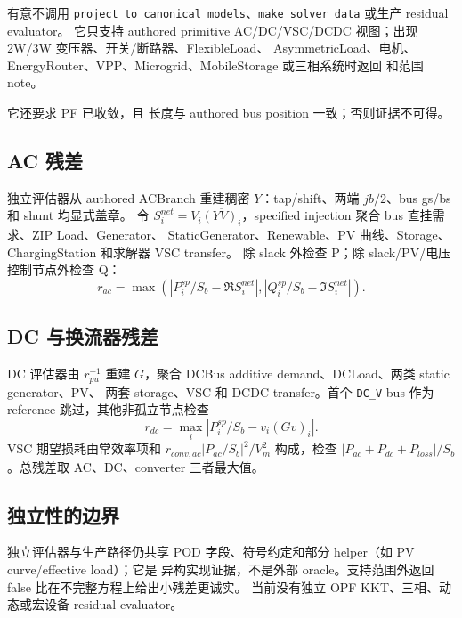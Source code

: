 有意不调用 \texttt{project\_to\_canonical\_models}、\texttt{make\_solver\_data} 或生产 residual evaluator。
它只支持 authored primitive AC/DC/VSC/DCDC 视图；出现 2W/3W 变压器、开关/断路器、FlexibleLoad、
AsymmetricLoad、电机、EnergyRouter、VPP、Microgrid、MobileStorage 或三相系统时返回
 和范围 note。

它还要求 PF 已收敛，且  长度与 authored bus position 一致；否则证据不可得。

\subsection{AC 残差}

独立评估器从 authored ACBranch 重建稠密 $Y$：tap/shift、两端 $jb/2$、bus gs/bs 和 shunt 均显式盖章。
令 $S_i^{net}=V_i\overline{(YV)_i}$，specified injection 聚合 bus 直挂需求、ZIP Load、Generator、
StaticGenerator、Renewable、PV 曲线、Storage、ChargingStation 和求解器 VSC transfer。
除 slack 外检查 P；除 slack/PV/电压控制节点外检查 Q：
\begin{equation}
r_{ac}=\max\left(
\left|P_i^{sp}/S_b-\Re S_i^{net}\right|,
\left|Q_i^{sp}/S_b-\Im S_i^{net}\right|
\right).
\end{equation}

\subsection{DC 与换流器残差}

DC 评估器由 $r_{pu}^{-1}$ 重建 $G$，聚合 DCBus additive demand、DCLoad、两类 static generator、PV、
两套 storage、VSC 和 DCDC transfer。首个 \texttt{DC\_V} bus 作为 reference 跳过，其他非孤立节点检查
\begin{equation}
r_{dc}=\max_i\left|P_i^{sp}/S_b-v_i(Gv)_i\right|.
\end{equation}
VSC 期望损耗由常效率项和 $r_{conv,ac}|P_{ac}/S_b|^2/V_m^2$ 构成，检查
$|P_{ac}+P_{dc}+P_{loss}|/S_b$。总残差取 AC、DC、converter 三者最大值。

\subsection{独立性的边界}

独立评估器与生产路径仍共享 POD 字段、符号约定和部分 helper（如 PV curve/effective load）；它是
异构实现证据，不是外部 oracle。支持范围外返回 false 比在不完整方程上给出小残差更诚实。
当前没有独立 OPF KKT、三相、动态或宏设备 residual evaluator。

